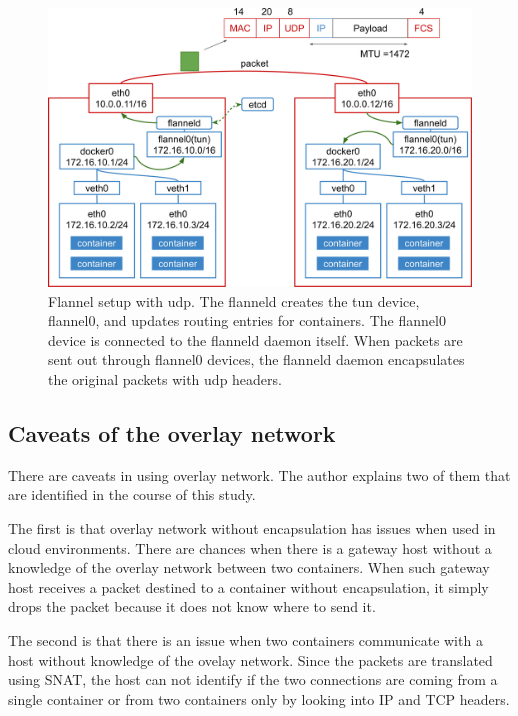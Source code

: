 \begin{figure}[h]
  \centering
  \includegraphics[width=0.95\columnwidth]{Figs/flannel-udp}

  \par\bigskip
  \centering
  \begin{minipage}{0.9\columnwidth}
    \caption[Flannel setup with udp]{
      Flannel setup with udp.
      The flanneld creates the tun device, flannel0, and updates routing entries for containers.
      The flannel0 device is connected to the flanneld daemon itself.
      When packets are sent out through flannel0 devices, the flanneld daemon encapsulates the original packets with udp headers.
    }
    \label{Figs/flannel-udp}
  \end{minipage}
\end{figure}

\FloatBarrier

\subsection{Caveats of the overlay network}

There are caveats in using overlay network.
The author explains two of them that are identified in the course of this study.


  The first is that overlay network without encapsulation has issues when used in cloud environments.
  There are chances when there is a gateway host without a knowledge of the overlay network between two containers.
  When such gateway host receives a packet destined to a container without encapsulation, it simply drops the packet because it does not know where to send it.

  The second is that there is an issue when two containers communicate with a host without knowledge of the ovelay network.
  Since the packets are translated using SNAT, the host can not identify if the two connections are coming from a single container or from two containers only by looking into IP and TCP headers.


